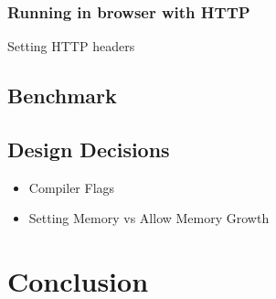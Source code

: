 \documentclass[11pt]{article}
\begin{document}
\subsubsection{Running in browser with HTTP}
Setting HTTP headers


\subsection{Benchmark}




\subsection{Design Decisions}
\begin{itemize}
    \item Compiler Flags
    \item Setting Memory vs Allow Memory Growth
\end{itemize}

\section{Conclusion}
\end{document}

